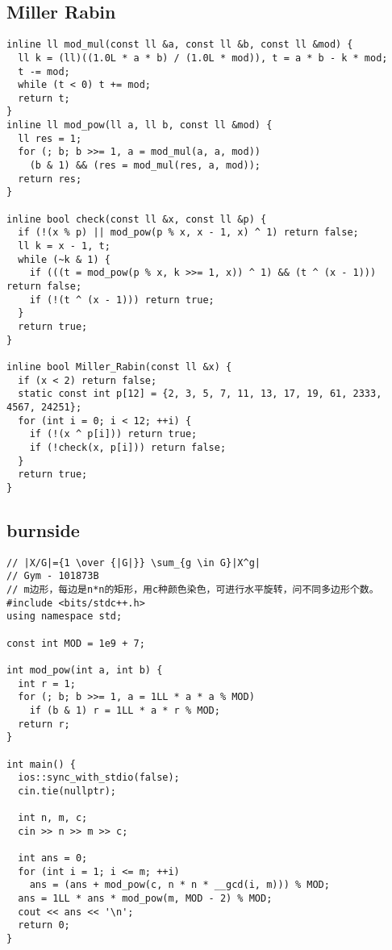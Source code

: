 \documentclass[twoside]{article}
\begin{document}
\subsection{Miller Rabin}
\begin{lstlisting}
inline ll mod_mul(const ll &a, const ll &b, const ll &mod) {
  ll k = (ll)((1.0L * a * b) / (1.0L * mod)), t = a * b - k * mod;
  t -= mod;
  while (t < 0) t += mod;
  return t;
}
inline ll mod_pow(ll a, ll b, const ll &mod) {
  ll res = 1;
  for (; b; b >>= 1, a = mod_mul(a, a, mod))
    (b & 1) && (res = mod_mul(res, a, mod));
  return res;
}

inline bool check(const ll &x, const ll &p) {
  if (!(x % p) || mod_pow(p % x, x - 1, x) ^ 1) return false;
  ll k = x - 1, t;
  while (~k & 1) {
    if (((t = mod_pow(p % x, k >>= 1, x)) ^ 1) && (t ^ (x - 1))) return false;
    if (!(t ^ (x - 1))) return true;
  }
  return true;
}

inline bool Miller_Rabin(const ll &x) {
  if (x < 2) return false;
  static const int p[12] = {2, 3, 5, 7, 11, 13, 17, 19, 61, 2333, 4567, 24251};
  for (int i = 0; i < 12; ++i) {
    if (!(x ^ p[i])) return true;
    if (!check(x, p[i])) return false;
  }
  return true;
}

\end{lstlisting}
\subsection{burnside}
\begin{lstlisting}
// |X/G|={1 \over {|G|}} \sum_{g \in G}|X^g|
// Gym - 101873B
// m边形，每边是n*n的矩形，用c种颜色染色，可进行水平旋转，问不同多边形个数。
#include <bits/stdc++.h>
using namespace std;

const int MOD = 1e9 + 7;

int mod_pow(int a, int b) {
  int r = 1;
  for (; b; b >>= 1, a = 1LL * a * a % MOD)
    if (b & 1) r = 1LL * a * r % MOD;
  return r;
}

int main() {
  ios::sync_with_stdio(false);
  cin.tie(nullptr);

  int n, m, c;
  cin >> n >> m >> c;

  int ans = 0;
  for (int i = 1; i <= m; ++i)
    ans = (ans + mod_pow(c, n * n * __gcd(i, m))) % MOD;
  ans = 1LL * ans * mod_pow(m, MOD - 2) % MOD;
  cout << ans << '\n';
  return 0;
}

\end{lstlisting}
\end{document}
